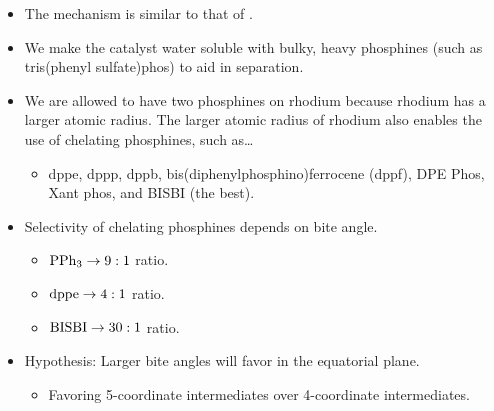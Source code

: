 \documentclass[../notes.tex]{subfiles}
\begin{document}
\begin{itemize}
\begin{itemize}
        \item The mechanism is similar to that of .
        \item We make the catalyst water soluble with bulky, heavy phosphines (such as tris(phenyl sulfate)phos) to aid in separation.
        \item We are allowed to have two phosphines on rhodium because rhodium has a larger atomic radius. The larger atomic radius of rhodium also enables the use of chelating phosphines, such as\dots
        \begin{itemize}
            \item dppe, dppp, dppb, bis(diphenylphosphino)ferrocene (dppf), DPE Phos, Xant phos, and BISBI (the best).
        \end{itemize}
        \item Selectivity of chelating phosphines depends on bite angle.
        \begin{itemize}
            \item $\ce{PPh3}\to 9:1$ ratio.
            \item $\ce{dppe}\to 4:1$ ratio.
            \item $\ce{BISBI}\to 30:1$ ratio.
        \end{itemize}
        \item Hypothesis: Larger bite angles will favor  in the equatorial plane.
        \begin{itemize}
            \item Favoring 5-coordinate intermediates over 4-coordinate intermediates.
        \end{itemize}
    \end{itemize}
\end{itemize}
\end{document}
